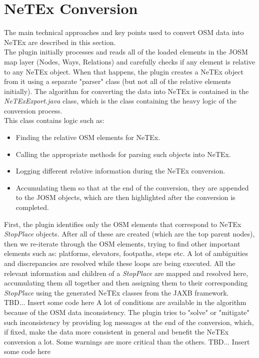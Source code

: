 \section{NeTEx Conversion}
The main technical approaches and key points used to convert OSM data into NeTEx are described in this section.\\
\newline
The plugin initially processes and reads all of the loaded elements in the JOSM map layer (Nodes, Ways, Relations) and carefully checks if any element is relative to any NeTEx object. When that happens, the plugin creates a NeTEx object from it using a separate "parser" class (but not all of the relative elements initially). The algorithm for converting the data into NeTEx is contained in the \textit{NeTExExport.java} class, which is the class containing the heavy logic of the conversion process. \\
This class contains logic such as: 
\begin{itemize}
	\item Finding the relative OSM elements for NeTEx.
	\item Calling the appropriate methods for parsing such objects into NeTEx.
	\item Logging different relative information during the NeTEx conversion.
	\item Accumulating them so that at the end of the conversion, they are appended to the JOSM objects, which are then highlighted after the conversion is completed.
\end{itemize}
First, the plugin identifies only the OSM elements that correspond to NeTEx \textit{StopPlace} objects. After all of these are created (which are the top parent nodes), then we re-iterate through the OSM elements, trying to find other important elements such as: platforms, elevators, footpaths, steps etc. A lot of ambiguities and discrepancies are resolved while these loops are being executed. All the relevant information and children of a \textit{StopPlace} are mapped and resolved here, accumulating them all together and then assigning them to their corresponding \textit{StopPlace} using the generated NeTEx classes from the JAXB framework.\\
TBD... Insert some code here
\newline
A lot of conditions are available in the algorithm because of the OSM data inconsistency. The plugin tries to "solve" or "mitigate" such inconsistency by providing log messages at the end of the conversion, which, if fixed, make the data more consistent in general and benefit the NeTEx conversion a lot. Some warnings are more critical than the others.
TBD... Insert some code here
